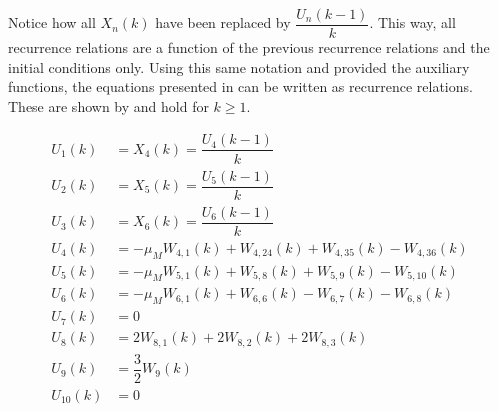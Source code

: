 Notice how all $X_{n}\left(k\right)$ have been replaced by $\dfrac{U_{n}\left(k-1\right)}{k}$. This way, all recurrence relations are a function of the previous recurrence relations and the initial conditions only. Using this same notation and provided the auxiliary functions, the equations presented in  can be written as recurrence relations. These are shown by  and hold for $k\geq 1$.

\begin{equation} \label{eq:allRecRel1}
\begin{split}
U_{1}\left(k\right)&=X_{4}\left(k\right)=\dfrac{U_{4}\left(k-1\right)}{k}\\
U_{2}\left(k\right)&=X_{5}\left(k\right)=\dfrac{U_{5}\left(k-1\right)}{k}\\
U_{3}\left(k\right)&=X_{6}\left(k\right)=\dfrac{U_{6}\left(k-1\right)}{k} \\
U_{4}\left(k\right)&=-\mu_{M}W_{4,1}\left(k\right)+W_{4,24}\left(k\right)+W_{4,35}\left(k\right)-W_{4,36}\left(k\right)\\
U_{5}\left(k\right)&=-\mu_{M}W_{5,1}\left(k\right)+W_{5,8}\left(k\right)+W_{5,9}\left(k\right)-W_{5,10}\left(k\right)\\
U_{6}\left(k\right)&=-\mu_{M}W_{6,1}\left(k\right)+W_{6,6}\left(k\right)-W_{6,7}\left(k\right)-W_{6,8}\left(k\right)\\
U_{7} \left(k\right)&=0 \\
U_{8}\left(k\right)&=2W_{8,1}\left(k\right)+2W_{8,2}\left(k\right)+2W_{8,3}\left(k\right)\\
U_{9}\left(k\right)&=\dfrac{3}{2}W_{9}\left(k\right)\\
U_{10} \left(k\right)&= 0 \\
\end{split}
\end{equation}



